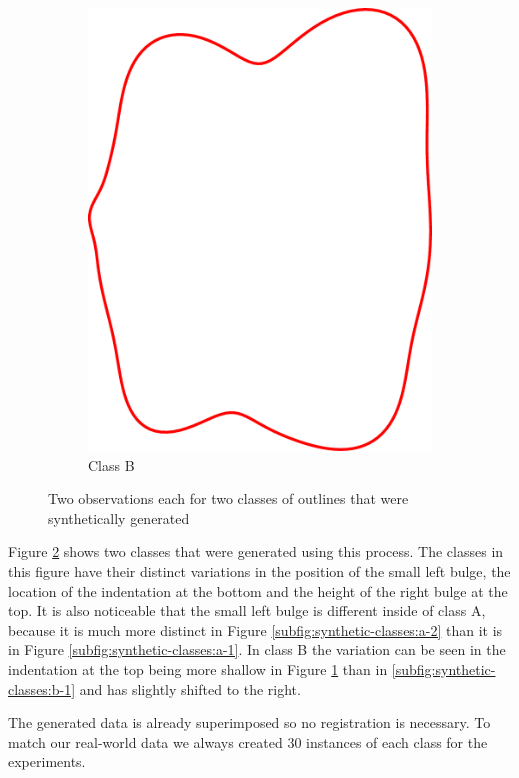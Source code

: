 \documentclass[pdftex,12pt,a4paper]{report}
\begin{document}
\begin{figure}[h]
\begin{subfigure}[b]{0.24\textwidth}
		\includegraphics[width=.9\linewidth]{img/synthetic-generation/classes/2-2.pdf}
		\caption{Class B}
		\label{subfig:synthetic-classes:b-2}
	\end{subfigure}
	\caption{Two observations each for two classes of outlines that were synthetically generated}
	\label{fig:synthetic-classes}
\end{figure}

Figure \ref{fig:synthetic-classes} shows two classes that were generated using this process. The classes in this figure have their distinct variations in the position of the small left bulge, the location of the indentation at the bottom and the height of the right bulge at the top. It is also noticeable that the small left bulge is different inside of class A, because it is much more distinct in Figure \ref{subfig:synthetic-classes:a-2} than it is in Figure \ref{subfig:synthetic-classes:a-1}. In class B the variation can be seen in the indentation at the top being more shallow in Figure \ref{subfig:synthetic-classes:b-2} than in \ref{subfig:synthetic-classes:b-1} and has slightly shifted to the right.

The generated data is already superimposed so no registration is necessary. To match our real-world data we always created 30 instances of each class for the experiments.
\end{document}

